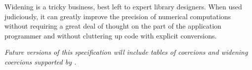 Widening is a tricky business, best left to expert library designers.
When used judiciously, it can greatly improve the precision of
numerical computations without requiring a great deal of thought on
the part of the application programmer and without cluttering up code
with explicit conversions.


\emph{Future versions of this specification will include tables of
  coercions and widening coercions supported by \library.}
